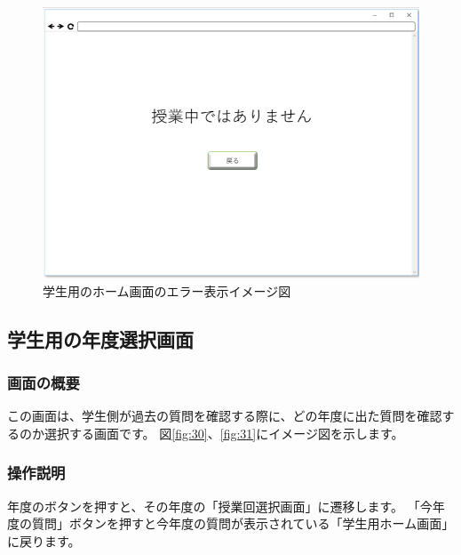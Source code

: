 \begin{figure}[phtbp]
  \begin{center}
    \includegraphics[width=1\linewidth,clip]{./img/00.png}
    \caption{学生用のホーム画面のエラー表示イメージ図}\label{fig:00}
  \end{center}
\end{figure}

\newpage

\subsection{学生用の年度選択画面}
\subsubsection{画面の概要}
この画面は、学生側が過去の質問を確認する際に、どの年度に出た質問を確認するのか選択する画面です。
図\ref{fig:30}、\ref{fig:31}にイメージ図を示します。

\subsubsection{操作説明}
年度のボタンを押すと、その年度の「授業回選択画面」に遷移します。
「今年度の質問」ボタンを押すと今年度の質問が表示されている「学生用ホーム画面」に戻ります。

